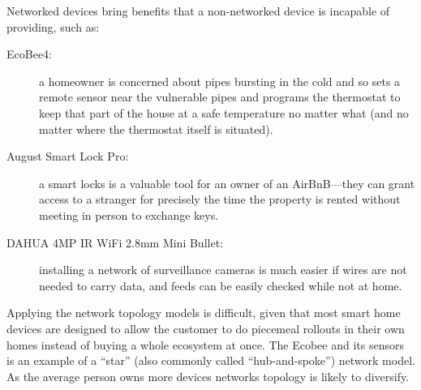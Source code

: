 \begin{mdframed}[backgroundcolor=gray!10]
Networked devices bring benefits that a non-networked device is incapable of providing, such as:

\begin{description}
\item[EcoBee4:] a homeowner is concerned about pipes bursting in the cold and so sets a remote sensor near the vulnerable pipes and programs the thermostat to keep that part of the house at a safe temperature no matter what (and no matter where the thermostat itself is situated).
\item[August Smart Lock Pro:]  a smart locks is a valuable tool for an owner of an AirBnB—they can grant access to a stranger for precisely the time the property is rented without meeting in person to exchange keys.
\item[DAHUA 4MP IR WiFi 2.8mm Mini Bullet:] installing a network of surveillance cameras is much easier if wires are not needed to carry data, and feeds can be easily checked while not at home.
\end{description}
Applying the network topology models is difficult, given that most smart home devices are designed to allow the customer to do piecemeal rollouts in their own homes instead of buying a whole ecosystem at once. The Ecobee and its sensors is an example of a “star” (also commonly called “hub-and-spoke”) network model. As the average person owns more devices networks topology is likely to diversify.
\end{mdframed}
